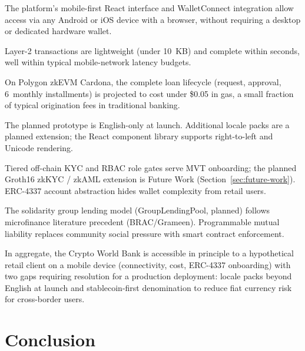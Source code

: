 \documentclass[12pt,a4paper]{report}
\begin{document}
\begin{description}[leftmargin=0pt]

\item[\textbf{1. Device access.}] The platform's mobile-first React interface and WalletConnect integration allow access via any Android or iOS device with a browser, without requiring a desktop or dedicated hardware wallet.

\item[\textbf{2. Connectivity.}] Layer-2 transactions are lightweight (under 10~KB) and complete within seconds, well within typical mobile-network latency budgets.

\item[\textbf{3. Transaction cost.}] On Polygon zkEVM Cardona, the complete loan lifecycle (request, approval, 6~monthly installments) is projected to cost under \$0.05 in gas, a small fraction of typical origination fees in traditional banking.

\item[\textbf{4. Language and literacy.}] The planned prototype is English-only at launch. Additional locale packs are a planned extension; the React component library supports right-to-left and Unicode rendering.

\item[\textbf{5. Identity and onboarding.}] Tiered off-chain KYC and RBAC role gates serve MVT onboarding; the planned Groth16 zkKYC / zkAML extension is Future Work (Section~\ref{sec:future-work}). ERC-4337 account abstraction hides wallet complexity from retail users.

\item[\textbf{6. Group lending fit.}] The solidarity group lending model (GroupLendingPool, planned) follows microfinance literature precedent (BRAC/Grameen). Programmable mutual liability replaces community social pressure with smart contract enforcement.

\end{description}

In aggregate, the Crypto World Bank is accessible in principle to a hypothetical retail client on a mobile device (connectivity, cost, ERC-4337 onboarding) with two gaps requiring resolution for a production deployment: locale packs beyond English at launch and stablecoin-first denomination to reduce fiat currency risk for cross-border users.


\chapter{Conclusion}
\end{document}

